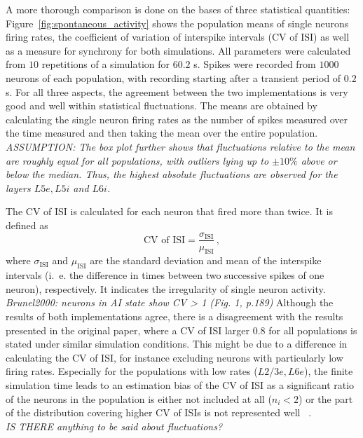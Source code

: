 A more thorough comparison is done on the bases of three statistical quantities: 
Figure~\ref{fig:spontaneous_activity} shows the population means of single neurons firing rates, 
the coefficient of variation of interspike intervals (CV of ISI) as well as a measure for synchrony for both 
simulations. All parameters were calculated from $10$ repetitions of a simulation for 
$60.2$ s. Spikes were recorded from $1000$ neurons of each population, with recording 
starting after a transient period of $0.2$ s. 
For all three aspects, the agreement between the two implementations is very good 
and well within statistical fluctuations. 
The means are obtained by calculating the single neuron firing rates as 
the number of spikes measured over the time measured and then taking the mean over the entire population. 
\emph{ASSUMPTION: The box plot further shows that 
fluctuations relative to the mean are roughly equal for all populations, with outliers lying 
up to $\pm 10 \%$ above or below the median. Thus, the highest absolute fluctuations are observed 
for the layers $L5e, L5i$ and $L6i$.} 

The CV of ISI is calculated for each neuron that fired more than twice.
It is defined as 
\begin{equation}
    \text{CV of ISI} = \frac{\sigma_\text{ISI}}{\mu_\text{ISI}} \,,
    \label{eq:cv_isi}
\end{equation}
where $\sigma_\text{ISI}$ and $\mu_\text{ISI}$ are the standard deviation and mean of 
the interspike intervals (i.~e. the difference in times between two successive spikes of one neuron), 
respectively. 
It indicates the irregularity of single neuron activity.\cite{potjans2014} 
\\\emph{Brunel2000: neurons in AI state show CV > 1 (Fig. 1, p.189)}
Although the results of both implementations agree, there is a disagreement with the results presented 
in the original paper, where a CV of ISI larger 0.8 for all populations is stated
under similar simulation conditions\cite{potjans2014}. 
This might be due to a difference in calculating the CV of ISI, for instance excluding neurons 
with particularly low firing rates. 
Especially 
for the populations with low rates ($L2/3e, L6e$), the finite simulation time leads to an estimation bias
of the CV of ISI as a significant ratio of the neurons in the population is either not included at all 
($n_i < 2$) or the part of the distribution covering higher CV of ISIs is not represented well~%
\cite{grun2010analysis}. 
\\\emph{IS THERE anything to be said about fluctuations?}

